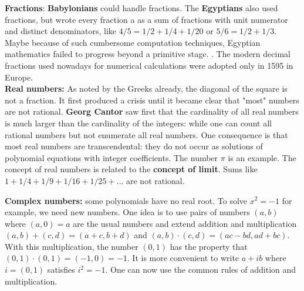 \documentclass[12pt]{amsart}
\newcounter{example}    \def\example#1{ \item \fontsize{12}{15} \selectfont #1 \fontsize{12}{15} \selectfont }
\begin{document}
{\bf Fractions}: 
{\bf Babylonians} could handle fractions. The {\bf Egyptians} also used fractions, but wrote every fraction a as a sum of fractions
with unit numerator and distinct denominators, like $4/5 = 1/2 + 1/4+1/20$ or
$5/6 = 1/2+1/3$. Maybe because of such cumbersome computation techniques, Egyptian mathematics failed
to progress beyond a primitive stage. \cite{SondheimerRogerson}.
The modern decimal fractions used nowadays for numerical calculations were 
adopted only in 1595 in Europe.  \\ %

{\bf Real numbers:} As noted by the Greeks already, the diagonal of the square is not a fraction. 
It first produced a crisis until it became clear that "most" numbers are not rational. 
{\bf Georg Cantor} saw first that the cardinality of all real numbers is much larger
than the cardinality of the integers: while one can count all rational numbers
but not enumerate all real numbers. One consequence is that most
real numbers are transcendental: they do not occur as solutions of polynomial equations with 
integer coefficients. The number $\pi$ is an example. The concept of real numbers is related to the
{\bf concept of limit}. Sums like $1+1/4+1/9+1/16+1/25 + \dots$ are not rational.

{\bf Complex numbers:} 
some polynomials have no real root. To solve $x^2=-1$ for example, we need new numbers.
One idea is to use pairs of numbers $(a,b)$ where $(a,0)=a$ are the usual numbers and extend addition and multiplication
$(a,b) + (c,d) = (a+c,b+d)$ and $(a,b) \cdot (c,d) = (ac-bd,ad+bc)$. With this multiplication, the number
$(0,1)$ has the property that $(0,1) \cdot (0,1) = (-1,0)=-1$.  It is more convenient to write $a+ib$ where $i=(0,1)$
satisfies $i^2=-1$. One can now use the common rules of addition and multiplication. 

\end{document}
